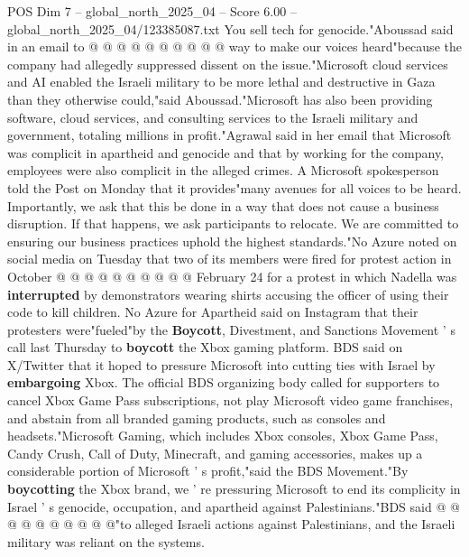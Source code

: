\begin{textsample}{POS Dim 7 – global\_north\_2025\_04 – Score 6.00 – global\_north\_2025\_04/123385087.txt}
You sell tech for genocide."Aboussad said in an email to @ @ @ @ @ @ @ @ @ @ way to make our voices heard"because the company had allegedly suppressed dissent on the issue."Microsoft cloud services and AI enabled the Israeli military to be more lethal and destructive in Gaza than they otherwise could,"said Aboussad."Microsoft has also been providing software, cloud services, and consulting services to the Israeli military and government, totaling millions in profit."Agrawal said in her email that Microsoft was complicit in apartheid and genocide and that by working for the company, employees were also complicit in the alleged crimes.
A Microsoft spokesperson told the Post on Monday that it provides"many avenues for all voices to be heard.
Importantly, we ask that this be done in a way that does not cause a business disruption.
If that happens, we ask participants to relocate.
We are committed to ensuring our business practices uphold the highest standards."No Azure noted on social media on Tuesday that two of its members were fired for protest action in October @ @ @ @ @ @ @ @ @ @ February 24 for a protest in which Nadella was \textbf{interrupted} by demonstrators wearing shirts accusing the officer of using their code to kill children.
No Azure for Apartheid said on Instagram that their protesters were"fueled"by the \textbf{Boycott}, Divestment, and Sanctions Movement ' s call last Thursday to \textbf{boycott} the Xbox gaming platform.
BDS said on X/Twitter that it hoped to pressure Microsoft into cutting ties with Israel by \textbf{embargoing} Xbox.
The official BDS organizing body called for supporters to cancel Xbox Game Pass subscriptions, not play Microsoft video game franchises, and abstain from all branded gaming products, such as consoles and headsets."Microsoft Gaming, which includes Xbox consoles, Xbox Game Pass, Candy Crush, Call of Duty, Minecraft, and gaming accessories, makes up a considerable portion of Microsoft ' s profit,"said the BDS Movement."By \textbf{boycotting} the Xbox brand, we ' re pressuring Microsoft to end its complicity in Israel ' s genocide, occupation, and apartheid against Palestinians."BDS said @ @ @ @ @ @ @ @ @ @"to alleged Israeli actions against Palestinians, and the Israeli military was reliant on the systems.

\end{textsample}
